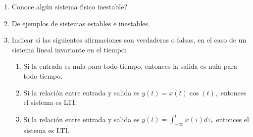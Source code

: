 \begin{enumerate}
\item \textquestiondown Conoce alg\'{u}n sistema f\'{\i}sico inestable?
\item De ejemplos de sistemas estables e inestables.
\item Indicar si las siguientes afirmaciones son verdaderas o falsas, en el caso de un sistema lineal 
invariante en el tiempo:
\begin{enumerate}
\item  Si la entrada es nula para todo tiempo, entonces la salida es nula para todo tiempo.

\item  Si la relaci\'{o}n entre entrada y salida es 
$y\left(t\right) =x\left( t\right) \cos \left( t\right) ,$ entonces el sistema  es LTI. 

\item  Si la relaci\'{o}n entre entrada y salida es 
$y\left(t\right) =\int_{-\infty }^{t}x\left( \tau \right) d\tau ,$ entonces el sistema es LTI. 
\end{enumerate}
\end{enumerate}





